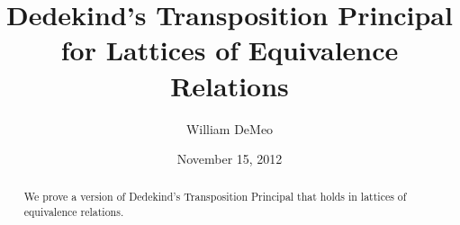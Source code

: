 \documentclass[11pt,reqno]{amsart}
\theoremstyle{plain}
\theoremstyle{definition}
\theoremstyle{remark}
\newcommand{\<}{\ensuremath{\langle}}
\renewcommand{\>}{\ensuremath{\rangle}}
\begin{document}
\title{Dedekind's Transposition Principal for Lattices of Equivalence Relations}
\date{November 15, 2012}
\author{William DeMeo}
\address{Department of Mathematics\\
University of South Carolina\\Columbia 29208\\USA}



\begin{abstract}
We prove a version of Dedekind's Transposition
Principal that holds in  lattices of equivalence relations.
\end{abstract}

\maketitle
\end{document}
